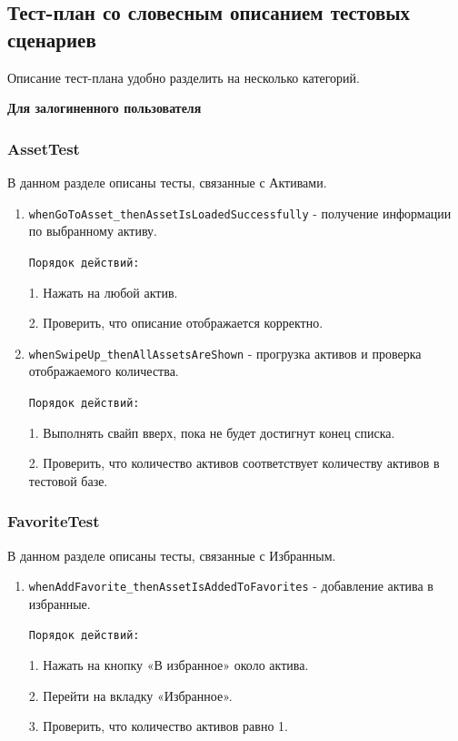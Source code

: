 \documentclass[a4paper, 14pt]{article}
\begin{document}
\subsection{Тест-план со словесным описанием тестовых сценариев}

Описание тест-плана удобно разделить на несколько категорий.

\textbf{Для залогиненного пользователя}
\subsubsection{AssetTest}

В данном разделе описаны тесты, связанные с Активами.

\begin{enumerate}
    \item \texttt{whenGoToAsset\_thenAssetIsLoadedSuccessfully} - получение информации по выбранному активу.
    
    \texttt{Порядок действий:}
    
    1. Нажать на любой актив.
    
    2. Проверить, что описание отображается корректно.
    \item \texttt{whenSwipeUp\_thenAllAssetsAreShown} - прогрузка активов и проверка отображаемого количества.

    \texttt{Порядок действий:}
    
    1. Выполнять свайп вверх, пока не будет достигнут конец списка.
    
    2. Проверить, что количество активов соответствует количеству активов в тестовой базе.
    
\end{enumerate}

\subsubsection{FavoriteTest}

В данном разделе описаны тесты, связанные с Избранным.

\begin{enumerate}
    \item \texttt{whenAddFavorite\_thenAssetIsAddedToFavorites} - добавление актива в избранные.

    \texttt{Порядок действий:}
    
    1. Нажать на кнопку «В избранное» около актива.
    
    2. Перейти на вкладку «Избранное».

    3. Проверить, что количество активов равно 1.
    
\end{enumerate}
\end{document}
